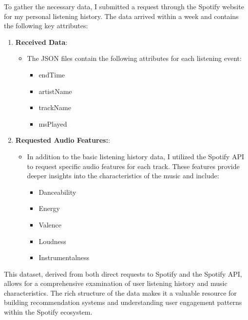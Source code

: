 \documentclass[
]{article}
\providecommand{\tightlist}{%
  \setlength{\itemsep}{0pt}\setlength{\parskip}{0pt}}
\begin{document}
To gather the necessary data, I submitted a request through the Spotify
website for my personal listening history. The data arrived within a
week and contains the following key attributes:

\begin{enumerate}
\def\labelenumi{\arabic{enumi}.}
\tightlist
\item
  \textbf{Received Data}:

  \begin{itemize}
  \tightlist
  \item
    The JSON files contain the following attributes for each listening
    event:

    \begin{itemize}
    \tightlist
    \item
      endTime
    \item
      artistName
    \item
      trackName
    \item
      msPlayed
    \end{itemize}
  \end{itemize}
\item
  \textbf{Requested Audio Features:}:

  \begin{itemize}
  \tightlist
  \item
    In addition to the basic listening history data, I utilized the
    Spotify API to request specific audio features for each track. These
    features provide deeper insights into the characteristics of the
    music and include:

    \begin{itemize}
    \tightlist
    \item
      Danceability
    \item
      Energy
    \item
      Valence
    \item
      Loudness
    \item
      Instrumentalness
    \end{itemize}
  \end{itemize}
\end{enumerate}

This dataset, derived from both direct requests to Spotify and the
Spotify API, allows for a comprehensive examination of user listening
history and music characteristics. The rich structure of the data makes
it a valuable resource for building recommendation systems and
understanding user engagement patterns within the Spotify ecosystem.
\end{document}
